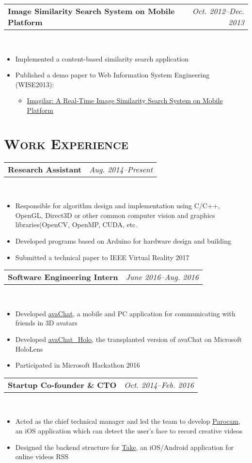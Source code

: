 \documentclass[11pt,a4paper,roman]{moderncv}        %
\makeatletter
\newcommand{\cvexpr}[5][1em]{
  \begin{tabular*}{\maincolumnwidth}{l@{\extracolsep{\fill}}r}%
    {\textbf{#3}\ifthenelse{\equal{#4}{}}{}{, #4}} & {\small\itshape#2}%
  \end{tabular*}%
  \\
  \begin{minipage}{\maincolumnwidth}%
        #5%
  \end{minipage}%
  \par\addvspace{#1}
}
\makeatother
\begin{document}
\cvexpr{Oct. 2012--Dec. 2013}{Image Similarity Search System on Mobile Platform}{University of Queensland}{
\begin{itemize}
\item Implemented a content-based similarity search application
\item Published a demo paper to Web Information System Engineering (WISE2013):
\begin{itemize}
\item \href{http://link.springer.com/chapter/10.1007\%2F978-3-642-41154-0_47}{Imagilar: A Real-Time Image Similarity Search System on Mobile Platform}
\end{itemize}
\end{itemize}
}

\section{\scshape Work Experience}
\cvexpr{Aug. 2014--Present}{Research Assistant}{School of Software, Tsinghua University}{
\begin{itemize}
\item Responsible for algorithm design and implementation using C/C++, OpenGL, Direct3D or other common computer vision and graphics libraries(OpenCV, OpenMP, CUDA, etc.
\item Developed programs based on Arduino for hardware design and building
\item Submitted a technical paper to IEEE Virtual Reality 2017
\end{itemize}
}

\cvexpr{June 2016--Aug. 2016}{Software Engineering Intern}{Windows and Devices Group, Microsoft}{
\begin{itemize}
\item Developed \href{http://bichengluo.me/\#avaChat}{avaChat}, a mobile and PC application for communicating with friends in 3D avatars
\item Developed \href{http://bichengluo.me/\#avaChat}{avaChat\_Holo}, the transplanted version of avaChat on Microsoft HoloLens
\item Participated in Microsoft Hackathon 2016
\end{itemize}
}

\cvexpr{Oct. 2014--Feb. 2016}{Startup Co-founder \& CTO}{Leezee Co., Ltd.}{
\begin{itemize}
\item Acted as the chief technical manager and led the team to develop \href{https://itunes.apple.com/us/app/parocam-funniest-camera-ever/id971725907}{Parocam}, an iOS application which can detect the user's face to record creative videos
\item Designed the backend structure for \href{http://www.takevideo.cn/}{Take}, an iOS/Android application for online videos RSS
\end{itemize}
}
\end{document}
